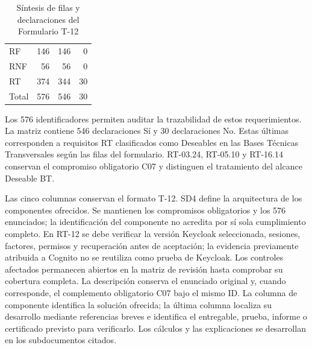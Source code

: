 \begin{longtable}{|L{5.6cm}|r|r|r|}
\caption{Síntesis de filas y declaraciones del Formulario T-12}\label{tab:t12-sintesis}\\
\hline
{} &  &  &  \\ \hline
RF & 146 & 146 & 0 \\ \hline
RNF & 56 & 56 & 0 \\ \hline
RT & 374 & 344 & 30 \\ \hline
Total & 576 & 546 & 30 \\ \hline
\end{longtable}

Los 576 identificadores permiten auditar la trazabilidad de estos requerimientos. La matriz contiene 546 declaraciones Sí y 30 declaraciones No. Estas últimas corresponden a requisitos RT clasificados como Deseables en las Bases Técnicas Transversales según las filas del formulario. RT-03.24, RT-05.10 y RT-16.14 conservan el compromiso obligatorio C07 y distinguen el tratamiento del alcance Deseable BT. 

Las cinco columnas conservan el formato T-12. SD4 define la arquitectura de los componentes ofrecidos. Se mantienen los compromisos obligatorios y los 576 enunciados; la identificación del componente no acredita por sí sola cumplimiento completo. En RT-12 se debe verificar la versión Keycloak seleccionada, sesiones, factores, permisos y recuperación antes de aceptación; la evidencia previamente atribuida a Cognito no se reutiliza como prueba de Keycloak. Los controles afectados permanecen abiertos en la matriz de revisión hasta comprobar su cobertura completa. La descripción conserva el enunciado original y, cuando corresponde, el complemento obligatorio C07 bajo el mismo ID. La columna de componente identifica la solución ofrecida; la última columna localiza su desarrollo mediante referencias breves e identifica el entregable, prueba, informe o certificado previsto para verificarlo. Los cálculos y las explicaciones se desarrollan en los subdocumentos citados.

